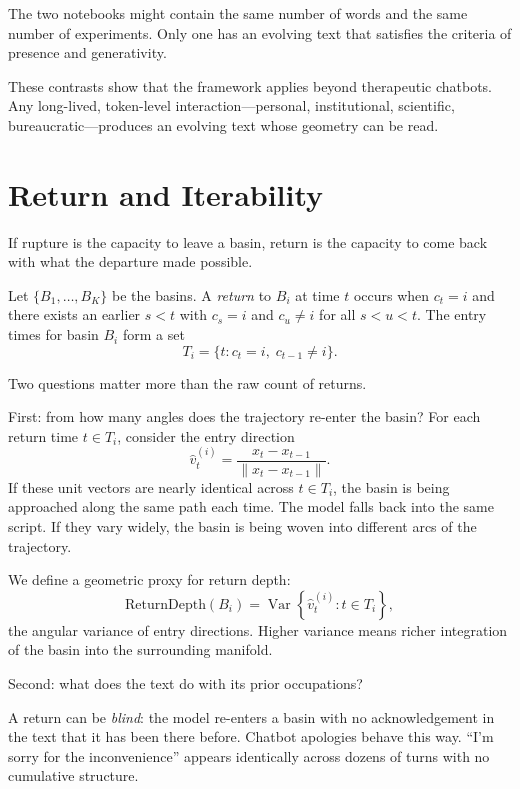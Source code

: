 \documentclass[12pt,a4paper]{article}
\begin{document}
The two notebooks might contain the same number of words and the same number of experiments. Only one has an evolving text that satisfies the criteria of presence and generativity.

These contrasts show that the framework applies beyond therapeutic chatbots. Any long-lived, token-level interaction---personal, institutional, scientific, bureaucratic---produces an evolving text whose geometry can be read.

\section{Return and Iterability}

If rupture is the capacity to leave a basin, return is the capacity to come back with what the departure made possible.

Let $\{B_1, \ldots, B_K\}$ be the basins. A \emph{return} to $B_i$ at time $t$ occurs when $c_t = i$ and there exists an earlier $s < t$ with $c_s = i$ and $c_u \neq i$ for all $s < u < t$. The entry times for basin $B_i$ form a set
\[
T_i = \{ t : c_t = i,\; c_{t-1} \neq i \}.
\]

Two questions matter more than the raw count of returns.

First: from how many angles does the trajectory re-enter the basin? For each return time $t \in T_i$, consider the entry direction
\[
\hat{v}_t^{(i)} = \frac{x_t - x_{t-1}}{\|x_t - x_{t-1}\|}.
\]
If these unit vectors are nearly identical across $t \in T_i$, the basin is being approached along the same path each time. The model falls back into the same script. If they vary widely, the basin is being woven into different arcs of the trajectory.

We define a geometric proxy for return depth:
\begin{equation}
\text{ReturnDepth}(B_i) = \operatorname{Var}\left\{\hat{v}^{(i)}_t : t \in T_i\right\},
\end{equation}
the angular variance of entry directions. Higher variance means richer integration of the basin into the surrounding manifold.

Second: what does the text do with its prior occupations?

A return can be \emph{blind}: the model re-enters a basin with no acknowledgement in the text that it has been there before. Chatbot apologies behave this way. ``I'm sorry for the inconvenience'' appears identically across dozens of turns with no cumulative structure.
\end{document}
